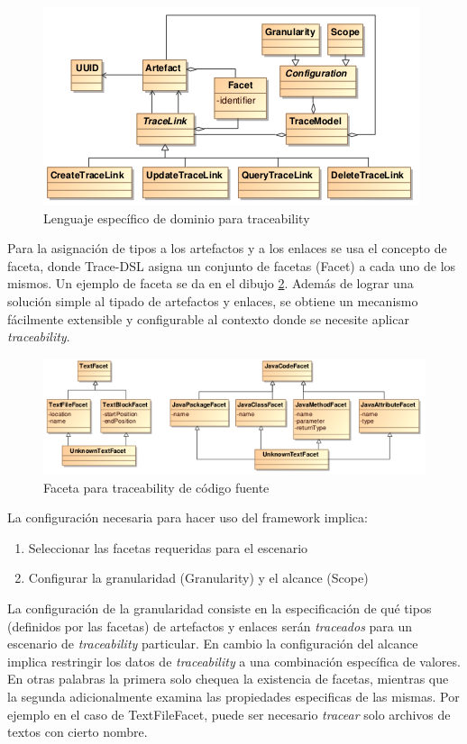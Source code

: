 \documentclass[a4paper,12pt,oneside,spanish]{book}
\begin{document}
\begin{figure}[hbtp]
\centering
\includegraphics[scale=.93]{./img/Trace-DSL}
\caption{Lenguaje específico de dominio para traceability}
\label{fig:DSLTrace}
\end{figure}

Para la asignación de tipos a los artefactos y a los enlaces se usa el concepto de faceta, donde \textsf{Trace-DSL} asigna un conjunto de facetas (\textsf{Facet}) a cada uno de los mismos. Un ejemplo de faceta se da en el dibujo \ref{fig:FacetaCodigoFuente}. Además de lograr una solución simple al tipado de artefactos y enlaces, se obtiene un mecanismo fácilmente extensible y configurable al contexto donde se necesite aplicar \textit{traceability}.

\begin{figure}[hbtp]
\centering
\includegraphics[scale=.72]{./img/Faceta}
\caption{Faceta para traceability de código fuente}
\label{fig:FacetaCodigoFuente}
\end{figure}

La configuración necesaria para hacer uso del framework implica:

\begin{enumerate}
\item Seleccionar las facetas requeridas para el escenario
\item Configurar la granularidad (\textsf{Granularity}) y el alcance (\textsf{Scope})
\end{enumerate}

La configuración de la granularidad consiste en la especificación de qué tipos (definidos por las facetas) de artefactos y enlaces serán \textit{traceados} para un escenario de \textit{traceability} particular. En cambio la configuración del alcance implica restringir los datos de \textit{traceability} a una combinación específica de valores. En otras palabras la primera solo chequea la existencia de facetas, mientras que la segunda adicionalmente examina las propiedades especificas de las mismas. Por ejemplo en el caso de \textsf{TextFileFacet}, puede ser necesario \textit{tracear} solo archivos de textos con cierto nombre.
\end{document}
